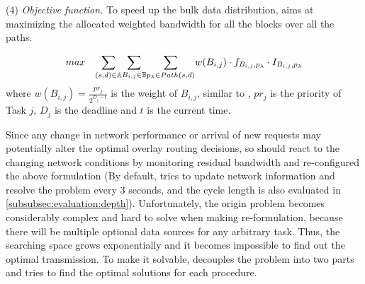 
\noindent(4) {\em Objective function.} To speed up the bulk data distribution, \name aims at maximizing the allocated weighted bandwidth for all the blocks over all the paths.

\begin{equation}
\centering
max \quad \displaystyle{\sum_{(s,d)\in \mathbb{A}}} \displaystyle{\sum_{B_{i,j} \in \mathbb{B}}} \displaystyle{\sum_{p_{\lambda}\in Path(s,d)}} w(B_{i,j})\cdot f_{B_{i,j},p_\lambda} \cdot I_{B_{i,j},p_\lambda}
\label{equation:objective}
\end{equation}
where $w(B_{i,j}) = \frac{pr_j}{2^{D_j-t}}$ is the weight of $B_{i,j}$, similar to \cite{zhang2015guarantee}, $pr_j$ is the priority of Task $j$, $D_j$ is the deadline and $t$ is the current time.

Since any change in network performance or arrival of
new requests may potentially alter the optimal overlay
routing decisions,
so \name should react to the changing network conditions by monitoring residual bandwidth and re-configured the above formulation (By default, \name tries to update network information and resolve the problem every 3 seconds, and the cycle length is also evaluated in \Section\ref{subsubsec:evaluation:depth}). Unfortunately, the origin problem becomes considerably complex and hard to solve when making re-formulation, because there will be multiple optional data sources for any arbitrary task. Thus, the searching space grows exponentially and it becomes impossible to find out the optimal transmission. To make it solvable, \name decouples the problem into two parts and tries to find the optimal solutions for each procedure.


